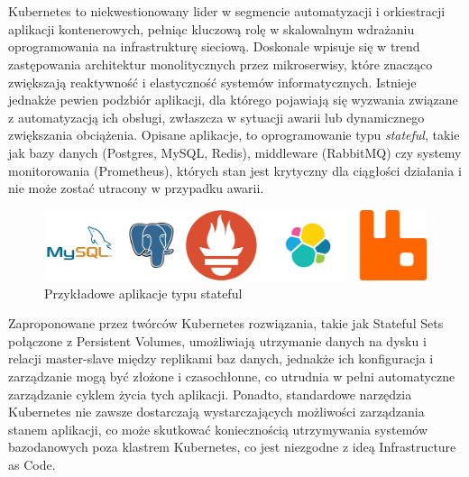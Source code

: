\documentclass[polish]{aghengthesis}
\author{Dominika Bocheńczyk\\Mateusz Łopaciński\\Piotr Magiera\\Michał Wójcik}
\date{\the\year}
\begin{document}
\maketitle

\tableofcontents

\chapter{\ChapterTitleIntroduction}
\label{sec:wprowadzenie}

Kubernetes to niekwestionowany lider w segmencie automatyzacji i orkiestracji aplikacji kontenerowych, pełniąc kluczową rolę w skalowalnym wdrażaniu oprogramowania na infrastrukturę sieciową. Doskonale wpisuje się w trend zastępowania architektur monolitycznych przez mikroserwisy, które znacząco zwiększają reaktywność i elastyczność systemów informatycznych. Istnieje jednakże pewien podzbiór aplikacji, dla którego pojawiają się wyzwania związane z automatyzacją ich obsługi, zwłaszcza w sytuacji awarii lub dynamicznego zwiększania obciążenia. Opisane aplikacje, to oprogramowanie typu \textit{stateful}, takie jak bazy danych (Postgres, MySQL, Redis), middleware (RabbitMQ) czy systemy monitorowania (Prometheus), których stan jest krytyczny dla ciągłości działania i nie może zostać utracony w przypadku awarii.

\begin{figure}[h!]
    \centering
    \includegraphics[width=1\linewidth]{resources/stateful_apps.png}
    \caption{Przykładowe aplikacje typu stateful}
    \label{fig:stateful}
\end{figure}

Zaproponowane przez twórców Kubernetes rozwiązania, takie jak Stateful Sets połączone z Persistent Volumes, umożliwiają utrzymanie danych na dysku i relacji master-slave między replikami baz danych, jednakże ich konfiguracja i zarządzanie mogą być złożone i czasochłonne, co utrudnia w pełni automatyczne zarządzanie cyklem życia tych aplikacji. Ponadto, standardowe narzędzia Kubernetes nie zawsze dostarczają wystarczających możliwości zarządzania stanem aplikacji, co może skutkować koniecznością utrzymywania systemów bazodanowych poza klastrem Kubernetes, co jest niezgodne z ideą Infrastructure as Code.
\end{document}
